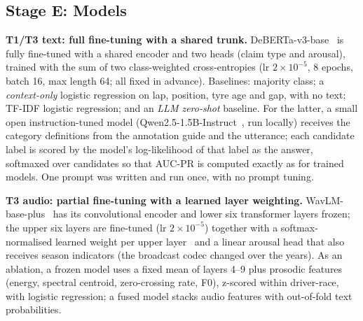 \subsection{Stage E: Models}
\textbf{T1/T3 text: full fine-tuning with a shared trunk.} DeBERTa-v3-base~\cite{he2023debertav3} is fully fine-tuned with a shared encoder and two heads (claim type and arousal), trained with the sum of two class-weighted cross-entropies (lr $2\times10^{-5}$, 8 epochs, batch 16, max length 64; all fixed in advance). Baselines: majority class; a \emph{context-only} logistic regression on lap, position, tyre age and gap, with no text; TF-IDF logistic regression; and an \emph{LLM zero-shot} baseline. For the latter, a small open instruction-tuned model (Qwen2.5-1.5B-Instruct~\cite{qwen2025qwen25}, run locally) receives the category definitions from the annotation guide and the utterance; each candidate label is scored by the model's log-likelihood of that label as the answer, softmaxed over candidates so that AUC-PR is computed exactly as for trained models. One prompt was written and run once, with no prompt tuning.

\textbf{T3 audio: partial fine-tuning with a learned layer weighting.} WavLM-base-plus~\cite{chen2022wavlm} has its convolutional encoder and lower six transformer layers frozen; the upper six layers are fine-tuned (lr $2\times10^{-5}$) together with a softmax-normalised learned weight per upper layer~\cite{yang2021superb} and a linear arousal head that also receives season indicators (the broadcast codec changed over the years). As an ablation, a frozen model uses a fixed mean of layers 4--9 plus prosodic features (energy, spectral centroid, zero-crossing rate, F0), z-scored within driver-race, with logistic regression; a fused model stacks audio features with out-of-fold text probabilities.

